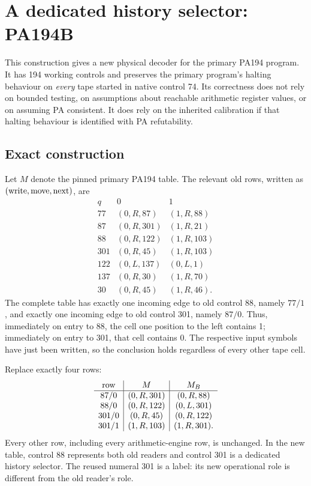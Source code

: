 \section{A dedicated history selector: PA194B}
\label{sec:history-selector}

This construction gives a new physical decoder for the primary PA194 program.
It has 194 working controls and preserves the primary program's halting
behaviour on \emph{every} tape started in native control 74.  Its correctness
does not rely on bounded testing, on assumptions about reachable arithmetic
register values, or on assuming PA consistent.  It does rely on the inherited
calibration if that halting behaviour is identified with PA refutability.

\subsection{Exact construction}
Let $M$ denote the pinned primary PA194 table.  The relevant old rows, written
as $(\hbox{write},\hbox{move},\hbox{next})$, are
\[
\begin{array}{c|cc}
q & 0 & 1\\\hline
77 & (0,R,87)&(1,R,88)\\
87 & (0,R,301)&(1,R,21)\\
88 & (0,R,122)&(1,R,103)\\
301&(0,R,45)&(1,R,103)\\
122&(0,L,137)&(0,L,1)\\
137&(0,R,30)&(1,R,70)\\
30 &(0,R,45)&(1,R,46).
\end{array}
\]
The complete table has exactly one incoming edge to old control 88, namely
$77/1$, and exactly one incoming edge to old control 301, namely $87/0$.
Thus, immediately on entry to 88, the cell one position to the left contains
1; immediately on entry to 301, that cell contains 0.  The respective input
symbols have just been written, so the conclusion holds regardless of every
other tape cell.

Replace exactly four rows:
\[
\begin{array}{c|c|c}
\hbox{row}&M& M_B\\\hline
87/0 &(0,R,301)&(0,R,88)\\
88/0 &(0,R,122)&(0,L,301)\\
301/0&(0,R,45)&(0,R,122)\\
301/1&(1,R,103)&(1,R,301).
\end{array}
\]
Every other row, including every arithmetic-engine row, is unchanged.
In the new table, control 88 represents both old readers and control 301
is a dedicated history selector.  The reused numeral 301 is a label: its
new operational role is different from the old reader's role.

